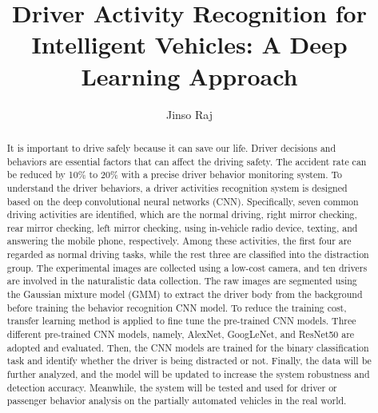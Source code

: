 \documentclass{article}
\begin{document}
\title{Driver Activity Recognition for Intelligent Vehicles:
A Deep Learning Approach}
\author{Jinso Raj}
\maketitle

\begin{abstract}
    It is important to drive safely because it can save our life. Driver decisions and behaviors are essential factors
that can affect the driving safety. The accident rate can be reduced by 10\% to 20\% with a precise driver behavior
    monitoring system. To understand the driver
behaviors, a driver activities recognition system is designed based
on the deep convolutional neural networks (CNN).
Specifically, seven common driving activities are identified, which
are the normal driving, right mirror checking, rear mirror
checking, left mirror checking, using in-vehicle radio device,
texting, and answering the mobile phone, respectively. Among
these activities, the first four are regarded as normal driving
tasks, while the rest three are classified into the distraction group.
The experimental images are collected using a low-cost camera,
and ten drivers are involved in the naturalistic data collection.
The raw images are segmented using the Gaussian mixture model
(GMM) to extract the driver body from the background before
training the behavior recognition CNN model.
To reduce the training cost, transfer learning method is applied to fine tune the pre-trained CNN models. Three different pre-trained CNN models, namely, AlexNet, GoogLeNet, and ResNet50 are adopted and evaluated. Then, the CNN models are trained for the binary classification task and identify whether the driver is being distracted or not. Finally, the data will be further analyzed, and the model will be updated to increase the system robustness and detection accuracy. Meanwhile, the system will be tested and used for driver or passenger behavior analysis on the partially automated vehicles in the real world.

\end{abstract}

\nocite{ieee}
\nocite{sec}

\printbibliography
\end{document}
